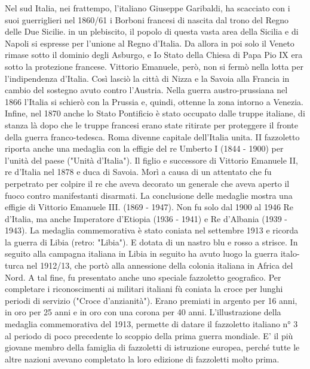 Nel sud Italia, nei frattempo, l'italiano Giuseppe Garibaldi, ha scacciato con i suoi guerriglieri nel 1860/61 i Borboni francesi di nascita dal trono del Regno delle Due Sicilie. in un plebiscito, il popolo di questa vasta area della Sicilia e di Napoli si espresse per l'unione al Regno d'Italia. Da allora in poi solo il Veneto rimase sotto il dominio degli Asburgo, e Io Stato della Chiesa di Papa Pio IX era sotto la protezione francese. Vittorio Emanuele, però, non si fermò nella lotta per l'indipendenza d'Italia. Così lasciò la città di Nizza e la Savoia alla Francia in cambio del sostegno avuto contro l'Austria. Nella guerra austro-prussiana nel 1866 l'Italia si schierò con la Prussia e, quindi, ottenne la zona intorno a Venezia. Infine, nel 1870 anche lo Stato Pontificio è stato occupato dalle truppe italiane, di stanza là dopo che le truppe francesi erano state ritirate per proteggere il fronte della guerra franco-tedesca. Roma divenne capitale dell'Italia unita.
   II fazzoletto riporta anche una medaglia con la effigie del re Umberto I (1844 - 1900) per l'unità del paese ("Unità d'Italia"). Il figlio e successore di Vittorio Emanuele II, re d'Italia nel 1878 e duca di Savoia. Morì a causa di un attentato che fu perpetrato per colpire il re che aveva decorato un generale che aveva aperto il fuoco contro manifestanti disarmati.
   La conclusione delle medaglie mostra una effigie di Vittorio Emanuele III. (1869 - 1947). Non fu solo dal 1900 al 1946 Re d'Italia, ma anche Imperatore d'Etiopia (1936 - 1941) e Re d'Albania (1939 - 1943). La medaglia commemorativa è stato coniata nel settembre 1913 e ricorda la guerra di Libia (retro: "Libia"). E dotata di un nastro blu e rosso a strisce. In seguito alla campagna italiana in Libia in seguito ha avuto luogo la guerra italo-turca nel 1912/13, che portò alla annessione della colonia italiana in Africa del Nord. A tal fine, fu presentato anche uno speciale fazzoletto geografico.
   Per completare i riconoscimenti ai militari italiani fù coniata la croce per lunghi periodi di servizio ("Croce d'anzianità"). Erano premiati in argento per 16 anni, in oro per 25 anni e in oro con una corona per 40 anni.
   L'illustrazione della medaglia commemorativa del 1913, permette di datare il fazzoletto italiano n° 3 al periodo di poco precedente lo scoppio della prima guerra mondiale. E' il più giovane membro della famiglia di fazzoletti di istruzione europea, perché tutte le altre nazioni avevano completato la loro edizione di fazzoletti molto prima.
   
\newpage


